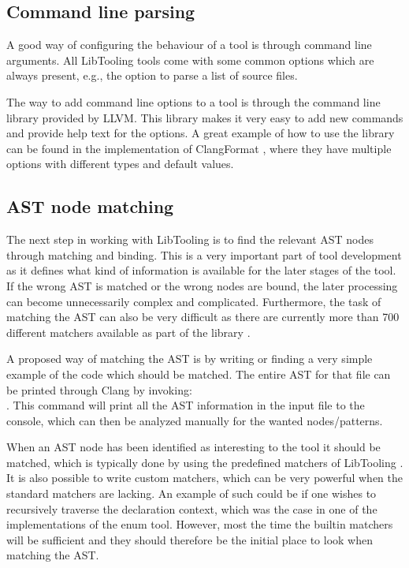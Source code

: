 \subsection{Command line parsing} \label{subsec:080dev:CMDLineParsing}

A good way of configuring the behaviour of a tool is through command line arguments. All LibTooling tools come with some common options which are always present, e.g., the option to parse a list of source files.

The way to add command line options to a tool is through the command line library provided by LLVM. This library makes it very easy to add new commands and provide help text for the options. A great example of how to use the library can be found in the implementation of ClangFormat \cite{clangClangFormatClangFormat2023}, where they have multiple options with different types and default values.

\subsection{AST node matching} \label{subsec:080dev:ASTNodeMatching}

The next step in working with LibTooling is to find the relevant AST nodes through matching and binding. This is a very important part of tool development as it defines what kind of information is available for the later stages of the tool. If the wrong AST is matched or the wrong nodes are bound, the later processing can become unnecessarily complex and complicated. Furthermore, the task of matching the AST can also be very difficult as there are currently more than 700 different matchers available as part of the library \cite{clangASTMatcherReference}. 

A proposed way of matching the AST is by writing or finding a very simple example of the code which should be matched. The entire AST for that file can be printed through Clang by invoking:\\ . 
This command will print all the AST information in the input file to the console, which can then be analyzed manually for the wanted nodes/patterns.

When an AST node has been identified as interesting to the tool it should be matched, which is typically done by using the predefined matchers of LibTooling \cite{clangASTMatcherReference}.
It is also possible to write custom matchers, which can be very powerful when the standard matchers are lacking. An example of such could be if one wishes to recursively traverse the declaration context, which was the case in one of the implementations of the enum tool.
However, most the time the builtin matchers will be sufficient and they should therefore be the initial place to look when matching the AST.

